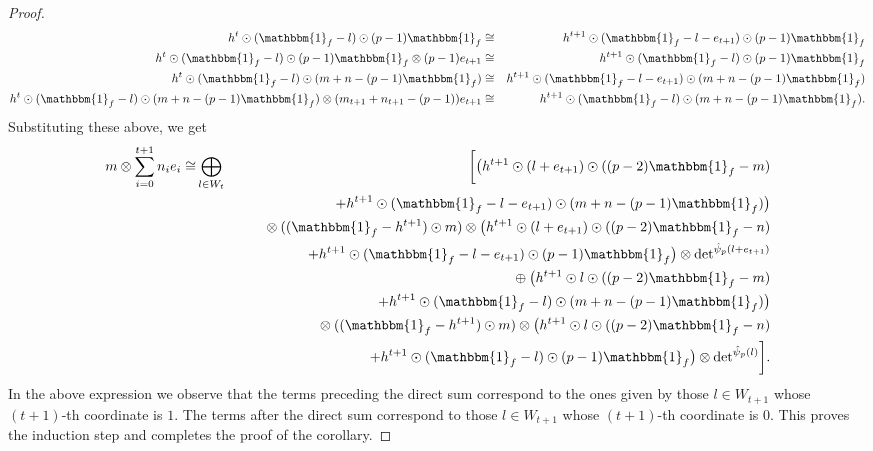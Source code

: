 \documentclass[10pt,a4paper]{amsart}
\begin{document}
\begin{proof}
{\begin{eqnarray*}
    h^t\odot(\mathbbm{1}_{f} - l)\odot(p-1)\mathbbm{1}_f &\cong& h^{t+1}\odot(\mathbbm{1}_{f} - l-e_{t+1})\odot(p-1)\mathbbm{1}_f \\
    h^t\odot(\mathbbm{1}_{f} - l)\odot(p-1)\mathbbm{1}_f \otimes (p-1)e_{t+1} &\cong& h^{t+1}\odot(\mathbbm{1}_{f} - l)\odot(p-1)\mathbbm{1}_f \\
    h^{t}\odot (\mathbbm{1}_{f} - l)\odot( m  + n  - (p-1)\mathbbm{1}_f) & \cong  &  h^{t+1}\odot (\mathbbm{1}_{f} - l - e_{t+1})\odot( m  + n  - (p-1)\mathbbm{1}_f) \\
        h^{t}\odot (\mathbbm{1}_{f} - l)\odot( m  + n  - (p-1)\mathbbm{1}_f)\otimes (m_{t+1} + n_{t+1} - (p-1))e_{t+1} & \cong &  h^{t+1}\odot (\mathbbm{1}_{f} - l)\odot( m  + n  - (p-1)\mathbbm{1}_f).
    \end{eqnarray*}
}    
\!\!\!Substituting these above, we get
{\small \begin{eqnarray*}
    m \otimes \sum_{i = 0}^{t+1}n_ie_i \cong & \bigoplus\limits_{l \in W_t}&\bigg[\big(h^{t+1}\odot (l + e_{t+1}) \odot ((p-2)\mathbbm{1}_f - m) \\
    &&\qquad \qquad + h^{t+1}\odot(\mathbbm{1}_f - l - e_{t+1})
    \odot (m + n - (p-1)\mathbbm{1}_f)\big) \\
    && \qquad \otimes \> ((\mathbbm{1}_f - h^{t+1})\odot m)\otimes \big(h^{t+1}\odot (l + e_{t+1})
    \odot((p-2)\mathbbm{1}_f - n) \\ 
    &&\qquad \qquad  + h^{t+1}  \odot(\mathbbm{1}_f - l - e_{t+1})\odot(p-1)\mathbbm{1}_f \big) \otimes \mathrm{det}^{\hat\psi_p(l + e_{t+1})}\\
    &&\quad  \oplus \> \big(h^{t+1}\odot l \odot ((p-2)\mathbbm{1}_f - m) \\
    &&\qquad \qquad + h^{t+1}\odot(\mathbbm{1}_f - l)
    \odot (m + n - (p-1)\mathbbm{1}_f)\big) \\
    &&\qquad \otimes \> ((\mathbbm{1}_f - h^{t+1})\odot m)\otimes \big(h^{t+1}\odot l
    \odot ((p-2)\mathbbm{1}_f - n) \\
    &&\qquad \qquad + h^{t+1} \odot(\mathbbm{1}_f - l)\odot(p-1)\mathbbm{1}_f \big) \otimes \mathrm{det}^{\hat\psi_p(l)} \bigg].
\end{eqnarray*}}
\!\!In the above expression we observe that the terms preceding the direct sum correspond to the ones given by those $l \in W_{t+1}$ whose $(t+1)$-th coordinate is $1$. The terms after the direct sum correspond to those $l \in W_{t+1}$ whose $(t+1)$-th coordinate is $0$. This proves the induction step and completes the proof of the corollary.
\end{proof}
\end{document}

